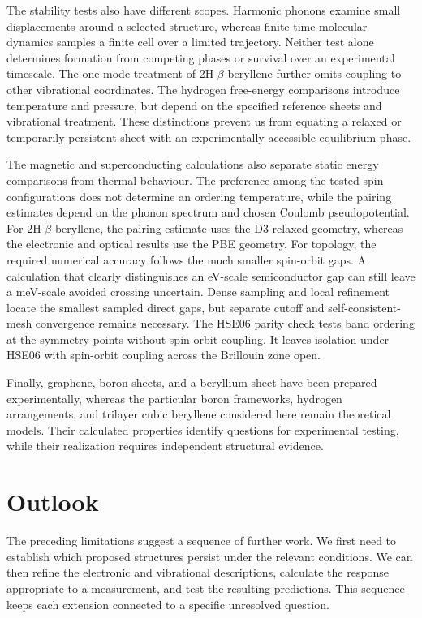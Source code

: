 The stability tests also have different scopes.
Harmonic phonons examine small displacements around a selected structure, whereas finite-time molecular dynamics samples a finite cell over a limited trajectory.
Neither test alone determines formation from competing phases or survival over an experimental timescale.
The one-mode treatment of 2H-$\beta$-beryllene further omits coupling to other vibrational coordinates.
The hydrogen free-energy comparisons introduce temperature and pressure, but depend on the specified reference sheets and vibrational treatment.
These distinctions prevent us from equating a relaxed or temporarily persistent sheet with an experimentally accessible equilibrium phase.

The magnetic and superconducting calculations also separate static energy comparisons from thermal behaviour.
The preference among the tested spin configurations does not determine an ordering temperature, while the pairing estimates depend on the phonon spectrum and chosen Coulomb pseudopotential.
For 2H-$\beta$-beryllene, the pairing estimate uses the D3-relaxed geometry, whereas the electronic and optical results use the PBE geometry.
For topology, the required numerical accuracy follows the much smaller spin-orbit gaps.
A calculation that clearly distinguishes an \unit{\electronvolt}-scale semiconductor gap can still leave a \unit{\milli\electronvolt}-scale avoided crossing uncertain.
Dense sampling and local refinement locate the smallest sampled direct gaps, but separate cutoff and self-consistent-mesh convergence remains necessary.
The HSE06 parity check tests band ordering at the symmetry points without spin-orbit coupling.
It leaves isolation under HSE06 with spin-orbit coupling across the Brillouin zone open.

Finally, graphene, boron sheets, and a beryllium sheet have been prepared experimentally, whereas the particular boron frameworks, hydrogen arrangements, and trilayer cubic beryllene considered here remain theoretical models.
Their calculated properties identify questions for experimental testing, while their realization requires independent structural evidence.

\FloatBarrier
\section{Outlook}
\label{sec:conclusions_outlook}

The preceding limitations suggest a sequence of further work.
We first need to establish which proposed structures persist under the relevant conditions.
We can then refine the electronic and vibrational descriptions, calculate the response appropriate to a measurement, and test the resulting predictions.
This sequence keeps each extension connected to a specific unresolved question.

